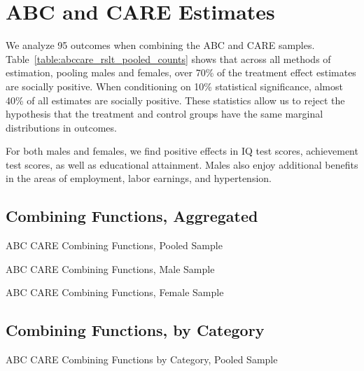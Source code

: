 \section{ABC and CARE Estimates}

We analyze 95 outcomes when combining the ABC and CARE samples. Table~\ref{table:abccare_rslt_pooled_counts} shows that across all methods of estimation, pooling males and females, over 70\% of the treatment effect estimates are socially positive. When conditioning on 10\% statistical significance, almost 40\% of all estimates are socially positive. These statistics allow us to reject the hypothesis that the treatment and control groups have the same marginal distributions in outcomes.

For both males and females, we find positive effects in IQ test scores, achievement test scores, as well as educational attainment. Males also enjoy additional benefits in the areas of employment, labor earnings, and hypertension.

\def\arraystretch{0.6}

\setlength\tabcolsep{0.3em}

\subsection{{Combining Functions, Aggregated}}


	\begin{table}[H]
     \caption{ABC CARE Combining Functions, Pooled Sample} 
     \label{table:abccare_rslt_pooled_counts}
	
	\end{table}  

	\begin{table}[H]
     \caption{ABC CARE Combining Functions, Male Sample} 
	
	\end{table}  

	\begin{table}[H]
     \caption{ABC CARE Combining Functions, Female Sample} 
	
	\end{table}  
\clearpage

\subsection{{Combining Functions, by Category}}


	\begin{table}[H]
     \caption{ABC CARE Combining Functions by Category, Pooled Sample} 
	
	\end{table}   

